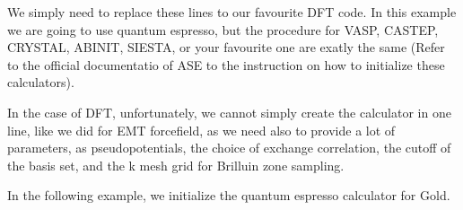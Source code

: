 \documentclass[a4paper,11pt,english]{sphinxmanual}
\begin{document}
\sphinxAtStartPar
We simply need to replace these lines to our favourite DFT code. In this example we are going to use quantum espresso, but the procedure for VASP, CASTEP, CRYSTAL, ABINIT, SIESTA, or your favourite one are exatly the same (Refer to the official documentatio of ASE to the instruction on how to initialize these calculators).

\sphinxAtStartPar
In the case of DFT, unfortunately, we cannot simply create the calculator in one line, like we did for EMT force\sphinxhyphen{}field, as we need also to provide a lot of parameters, as pseudopotentials, the choice of exchange correlation, the cutoff of the basis set, and the k mesh grid for Brilluin zone sampling.

\sphinxAtStartPar
In the following example, we initialize the quantum espresso calculator for Gold.
\end{document}
